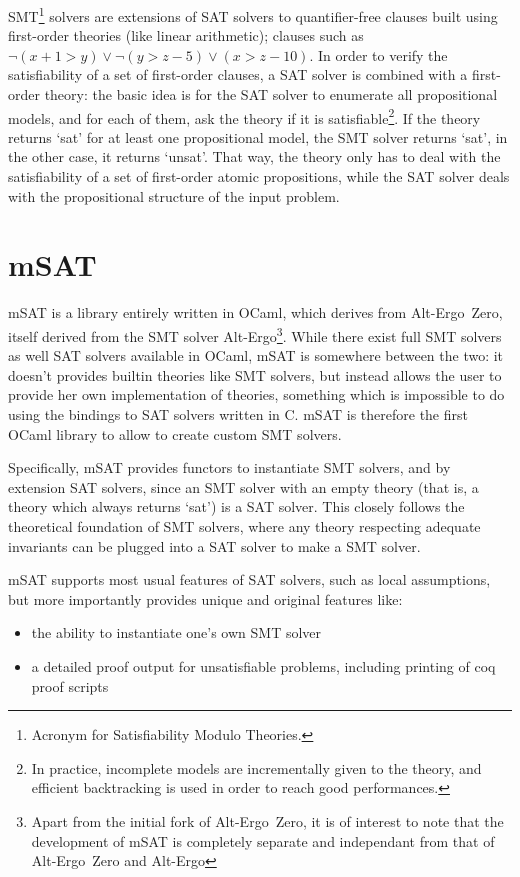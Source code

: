 \documentclass{llncs}
\def\aez{\textsf{Alt-Ergo~Zero}}
\def\altergo{\textsf{Alt-Ergo}}
\def\msat{\textsf{mSAT}}
\begin{document}
SMT\footnote{Acronym for Satisfiability Modulo Theories.} solvers are extensions
of SAT solvers to quantifier-free clauses built using first-order theories (like
linear arithmetic); clauses such as
$\neg (x + 1 > y) \lor \neg (y > z - 5) \lor (x > z - 10)$. In order to verify
the satisfiability of a set of first-order clauses, a SAT solver is combined
with a first-order theory: the basic idea is for the SAT solver to enumerate
all propositional models, and for each of them, ask the theory if it is
satisfiable\footnote{In practice, incomplete models are incrementally given to
the theory, and efficient backtracking is used in order to reach good
performances.}. If the theory returns `sat' for at least one propositional model,
the SMT solver returns `sat', in the other case, it returns `unsat'. That way,
the theory only has to deal with the satisfiability of a set of first-order
atomic propositions, while the SAT solver deals with the propositional structure
of the input problem.

\section*{\msat{}}

\msat{}\cite{msat} is a library entirely written in OCaml, which derives from
\aez{}\cite{aez}, itself derived from the SMT solver
\altergo{}\cite{altergo}\footnote{Apart from the initial fork of \aez{}, it is of
interest to note that the development of \msat{} is completely separate and independant
from that of \aez{} and \altergo{}}. While there exist full SMT solvers as well SAT solvers
available in OCaml, \msat{} is somewhere between the two: it doesn't provides builtin theories
like SMT solvers, but instead allows the user to provide her own implementation of
theories, something which is impossible to do using the bindings to SAT solvers written in C.
\msat{} is therefore the first OCaml library to allow to create custom SMT solvers.

Specifically, \msat{} provides functors to instantiate SMT solvers,
and by extension SAT solvers, since an SMT solver with an empty theory (that is, a
theory which always returns `sat') is a SAT solver. This closely follows the
theoretical foundation of SMT solvers, where any theory respecting adequate
invariants can be plugged into a SAT solver to make a SMT solver.

\msat{} supports most usual
features of SAT solvers, such as local assumptions, but more
importantly provides unique and original features like:
\begin{itemize}
  \item the ability to instantiate one's own SMT solver
  \item a detailed proof output for unsatisfiable problems, including printing
    of coq proof scripts
\end{itemize}
\end{document}
